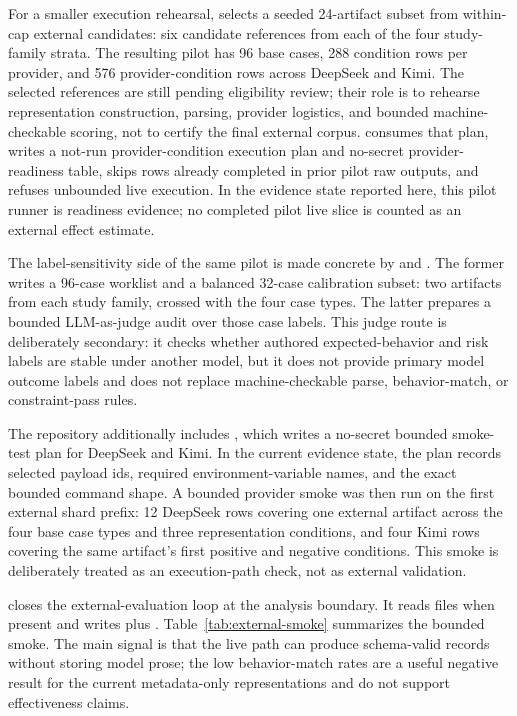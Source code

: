 \documentclass[11pt]{article}
\begin{document}
For a smaller execution rehearsal, 
selects a seeded 24-artifact subset from within-cap external candidates: six
candidate references from each of the four study-family strata. The resulting
pilot has 96 base cases, 288 condition rows per provider, and 576
provider-condition rows across DeepSeek and Kimi. The selected references are
still pending eligibility review; their role is to rehearse
representation construction, parsing, provider logistics, and bounded
machine-checkable scoring, not to certify
the final external corpus.
 consumes that plan, writes a
not-run provider-condition execution plan and no-secret provider-readiness
table, skips rows already completed in prior pilot raw outputs, and refuses
unbounded live execution. In the evidence state reported here, this pilot
runner is readiness evidence; no completed pilot live slice is counted as an
external effect estimate.

The label-sensitivity side of the same pilot is made concrete by
 and
. The former writes a 96-case
worklist and a balanced 32-case calibration subset: two artifacts from each
study family, crossed with the four case types. The latter prepares a bounded
LLM-as-judge audit over those case labels. This judge route is deliberately
secondary: it checks whether authored expected-behavior and risk labels are
stable under another model, but it does not provide primary model outcome
labels and does not replace machine-checkable parse, behavior-match, or
constraint-pass rules.

The repository additionally includes
, which writes a no-secret
bounded smoke-test plan for DeepSeek and Kimi. In the current evidence state,
the plan records selected payload ids, required environment-variable names,
and the exact bounded command shape. A bounded provider smoke was then run on
the first external shard prefix: 12 DeepSeek rows covering one external
artifact across the four base case types and three representation conditions,
and four Kimi rows covering the same artifact's first positive and negative
conditions. This smoke is deliberately treated as an execution-path check, not
as external validation.

 closes the external-evaluation
loop at the analysis boundary. It reads
 files when present
and writes  plus
. Table~\ref{tab:external-smoke}
summarizes the bounded smoke. The main signal is that the live path can produce
schema-valid records without storing model prose; the low behavior-match rates
are a useful negative result for the current metadata-only representations and
do not support effectiveness claims.
\end{document}
